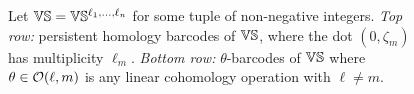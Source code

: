 

\begin{figure}
	\centering
	
	\caption{Let $\mathbb{V}\mathbb{S} = \mathbb{V}\mathbb{S}^{\ell_1,\dots,\ell_n}$ for some tuple of non-negative integers.
		\emph{Top row:} persistent homology barcodes of $\mathbb{V}\mathbb{S}$, where the dot $(0,\zeta_m)$ has multiplicity $\ell_m$.
		\emph{Bottom row:} $\theta$-barcodes of $\mathbb{V}\mathbb{S}$ where $\theta \in \mathcal{O}(\ell,m)$ is any linear cohomology operation with \(\ell \neq m\).}
	\label{fig:barcodes_vs}
\end{figure}